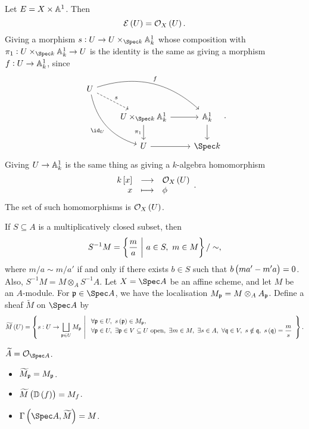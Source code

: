 \pagebreak

\begin{example*}
Let $ E = X \times \AA^1 $. Then
$$ \EEE\br{U} = \OOO_X\br{U}. $$
Giving a morphism $ s : U \to U \times_{\Spec k} \AA_k^1 $ whose composition with $ \pi_1 : U \times_{\Spec k} \AA_k^1 \to U $ is the identity is the same as giving a morphism $ f : U \to \AA_k^1 $, since
$$
\begin{tikzcd}
U \arrow[dashed]{dr}{s} \arrow[bend left=30]{drr}{f} \arrow[bend right=30]{ddr}[swap]{\id_U} & & \\
& U \times_{\Spec k} \AA_k^1 \arrow{r} \arrow{d}[swap]{\pi_1} & \AA_k^1 \arrow{d} \\
& U \arrow{r} & \Spec k
\end{tikzcd}.
$$
Giving $ U \to \AA_k^1 $ is the same thing as giving a $ k $-algebra homomorphism
$$ \function{k\sbr{x}}{\OOO_X\br{U}}{x}{\phi}. $$
The set of such homomorphisms is $ \OOO_X\br{U} $.
\end{example*}


If $ S \subseteq A $ is a multiplicatively closed subset, then
$$ S^{-1}M = \cbr{\dfrac{m}{a} \st a \in S, \ m \in M} / \sim, $$
where $ m / a \sim m / a' $ if and only if there exists $ b \in S $ such that $ b\br{ma' - m'a} = 0 $. Also, $ S^{-1}M = M \otimes_A S^{-1}A $. Let $ X = \Spec A $ be an affine scheme, and let $ M $ be an $ A $-module. For $ \ppp \in \Spec A $, we have the localisation $ M_\ppp = M \otimes_A A_\ppp $. Define a sheaf $ \widetilde{M} $ on $ \Spec A $ by
$$ \widetilde{M}\br{U} = \cbr{s : U \to \bigsqcup_{\ppp \in U} M_\ppp \st \begin{array}{l} \forall \ppp \in U, \ s\br{\ppp} \in M_\ppp, \\ \forall \ppp \in U, \ \exists \ppp \in V \subseteq U \ \text{open}, \ \exists m \in M, \ \exists s \in A, \ \forall \qqq \in V, \ s \notin \qqq, \ s\br{\qqq} = \dfrac{m}{s} \end{array}}. $$

\begin{example*}
$ \widetilde{A} = \OOO_{\Spec A} $.
\end{example*}

\begin{proposition}
\hfill
\begin{itemize}
\item $ \widetilde{M}_\ppp = M_\ppp $.
\item $ \widetilde{M}\br{\DD\br{f}} = M_f $.
\item $ \Gamma\br{\Spec A, \widetilde{M}} = M $.
\end{itemize}
\end{proposition}

